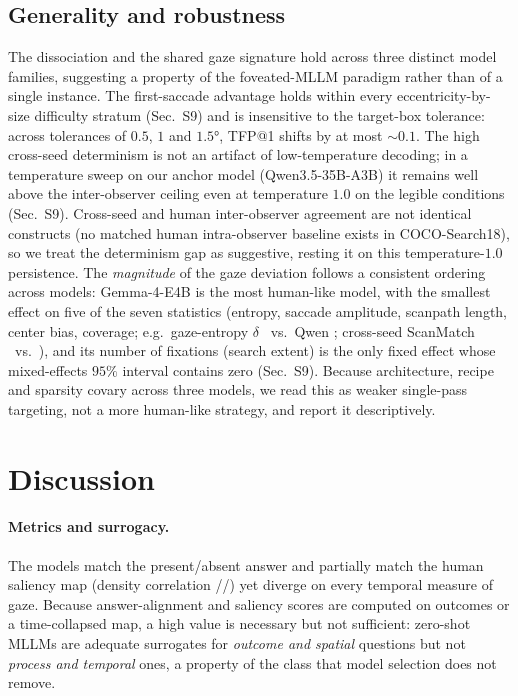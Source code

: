 \documentclass[runningheads]{llncs}
\begin{document}
 \vspace{-5mm}
\subsection{Generality and robustness}
The dissociation and the shared gaze signature hold across three distinct model families, suggesting a
property of the foveated-MLLM paradigm rather than of a single instance. The
first-saccade advantage holds within every eccentricity-by-size difficulty stratum (Sec.~S9) and is
insensitive to the target-box tolerance: across tolerances of $0.5$, $1$ and $1.5°$, TFP@1 shifts by at
most $\sim$$0.1$. The high cross-seed determinism is not an artifact of low-temperature decoding; in a
temperature sweep on our anchor model (Qwen3.5-35B-A3B) it remains well above the inter-observer ceiling even at
temperature $1.0$ on the legible conditions (Sec.~S9). Cross-seed and human inter-observer agreement are not identical constructs (no matched human intra-observer baseline exists in COCO-Search18), so we treat the determinism gap as suggestive, resting it on this temperature-$1.0$ persistence. The \emph{magnitude} of the gaze deviation follows a consistent ordering across models: Gemma-4-E4B is the most human-like model, with the smallest effect on five of the seven statistics (entropy, saccade amplitude, scanpath length, center bias, coverage; e.g.\ gaze-entropy $\delta$ \GemmaGPEntropyD\ vs.\ Qwen \QwenGPEntropyD; cross-seed ScanMatch \GemmaGPSelfConsist\ vs.\ \QwenGPSelfConsist), and its number of fixations (search extent) is the only fixed effect whose mixed-effects $95\%$ interval contains zero (Sec.~S9). Because architecture, recipe and sparsity covary across three models, we read this as weaker single-pass targeting, not a more human-like strategy, and report it descriptively.
 
 \vspace{-5mm}
\section{Discussion}
\paragraph{Metrics and surrogacy.} The models match the present/absent answer and partially match the
human saliency map (density correlation \QwenGPDensityCC/\GlmGPDensityCC/\GemmaGPDensityCC) yet diverge on
every temporal measure of gaze. Because answer-alignment and saliency scores are computed on outcomes or a
time-collapsed map, a high value is necessary but not sufficient: zero-shot MLLMs are adequate surrogates
for \emph{outcome and spatial} questions but not \emph{process and temporal} ones, a property of the class
that model selection does not remove.
 
\end{document}
